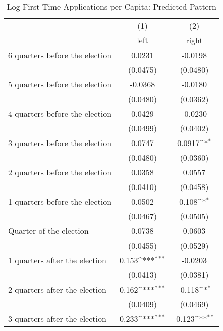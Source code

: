\begin{table}[htbp]\centering
\def\sym#1{\ifmmode^{#1}\else\(^{#1}\)\fi}
\caption{Log First Time Applications per Capita: Predicted Pattern}
\begin{tabular}{l*{2}{c}}
\hline\hline
                    &\multicolumn{1}{c}{(1)}&\multicolumn{1}{c}{(2)}\\
                    &\multicolumn{1}{c}{left}&\multicolumn{1}{c}{right}\\
\hline
 6 quarters before the election&      0.0231         &     -0.0198         \\
                    &    (0.0475)         &    (0.0480)         \\
[1em]
 5 quarters before the election&     -0.0368         &     -0.0180         \\
                    &    (0.0480)         &    (0.0362)         \\
[1em]
 4 quarters before the election&      0.0429         &     -0.0230         \\
                    &    (0.0499)         &    (0.0402)         \\
[1em]
 3 quarters before the election&      0.0747         &      0.0917\sym{*}  \\
                    &    (0.0480)         &    (0.0360)         \\
[1em]
 2 quarters before the election&      0.0358         &      0.0557         \\
                    &    (0.0410)         &    (0.0458)         \\
[1em]
 1 quarters before the election&      0.0502         &       0.108\sym{*}  \\
                    &    (0.0467)         &    (0.0505)         \\
[1em]
Quarter of the election&      0.0738         &      0.0603         \\
                    &    (0.0455)         &    (0.0529)         \\
[1em]
 1 quarters after the election&       0.153\sym{***}&     -0.0203         \\
                    &    (0.0413)         &    (0.0381)         \\
[1em]
 2 quarters after the election&       0.162\sym{***}&      -0.118\sym{*}  \\
                    &    (0.0409)         &    (0.0469)         \\
[1em]
 3 quarters after the election&       0.233\sym{***}&      -0.123\sym{**} \\

\end{tabular}
\end{table}
